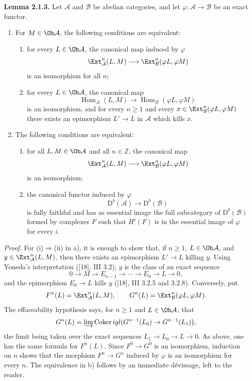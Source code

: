 \documentclass[11pt]{article}
\begin{document}
\textbf{Lemma 2.1.3.} Let $\mathcal A$ and $\mathcal B$ be abelian categories, and let $\varphi:\mathcal A\to\mathcal B$ be an exact functor.
\begin{enumerate}[label=\alph*)]
\item For $M\in\Ob\mathcal A$, the following conditions are equivalent:
\begin{enumerate}[label=(\roman*)]
\item for every $L\in\Ob\mathcal A$, the canonical map induced by $\varphi$
\[
\Ext^n_{\mathcal A}(L,M)\longrightarrow\Ext^n_{\mathcal B}(\varphi L,\varphi M)
\]
is an isomorphism for all $n$;
\item for every $L\in\Ob\mathcal A$, the canonical map
\[
\operatorname{Hom}_{\mathcal A}(L,M)\longrightarrow\operatorname{Hom}_{\mathcal B}(\varphi L,\varphi M)
\]
is an isomorphism, and for every $n\ge1$ and every $x\in\Ext^n_{\mathcal B}(\varphi L,\varphi M)$ there exists an epimorphism $L'\to L$ in $\mathcal A$ which kills $x$.
\end{enumerate}
\item The following conditions are equivalent:
\begin{enumerate}[label=(\roman*)]
\item for all $L,M\in\Ob\mathcal A$ and all $n\in\mathbb Z$, the canonical map
\[
\Ext^n_{\mathcal A}(L,M)\longrightarrow\Ext^n_{\mathcal B}(\varphi L,\varphi M)
\]
is an isomorphism;
\item the canonical functor induced by $\varphi$
\[
\mathrm D^b(\mathcal A)\longrightarrow\mathrm D^b(\mathcal B)
\]
is fully faithful and has as essential image the full subcategory of $\mathrm D^b(\mathcal B)$ formed by complexes $F$ such that $H^i(F)$ is in the essential image of $\varphi$ for every $i$.
\end{enumerate}
\end{enumerate}

\emph{Proof.} For (i)$\Rightarrow$(ii) in a), it is enough to show that, if $n\ge1$, $L\in\Ob\mathcal A$, and $y\in\Ext^n_{\mathcal A}(L,M)$, then there exists an epimorphism $L'\to L$ killing $y$. Using Yoneda's interpretation ([18], III 3.2), $y$ is the class of an exact sequence
\[
0\longrightarrow M\longrightarrow E_{n-1}\longrightarrow\cdots\longrightarrow E_0\longrightarrow L\longrightarrow0,
\]
and the epimorphism $E_0\to L$ kills $y$ ([18], III 3.2.5 and 3.2.8). Conversely, put
\[
F^n(L)=\Ext^n_{\mathcal A}(L,M),\qquad
G^n(L)=\Ext^n_{\mathcal B}(\varphi L,\varphi M).
\]
The effaceability hypothesis says, for $n\ge1$ and $L\in\Ob\mathcal A$, that
\[
G^n(L)=\varinjlim\operatorname{Coker}igl(G^{n-1}(L_0)\to G^{n-1}(L_1)\bigr),
\]
the limit being taken over the exact sequences $L_1\to L_0\to L\to0$. As above, one has the same formula for $F^n(L)$. Since $F^0\to G^0$ is an isomorphism, induction on $n$ shows that the morphism $F^n\to G^n$ induced by $\varphi$ is an isomorphism for every $n$. The equivalence in b) follows by an immediate dévissage, left to the reader.
\end{document}

